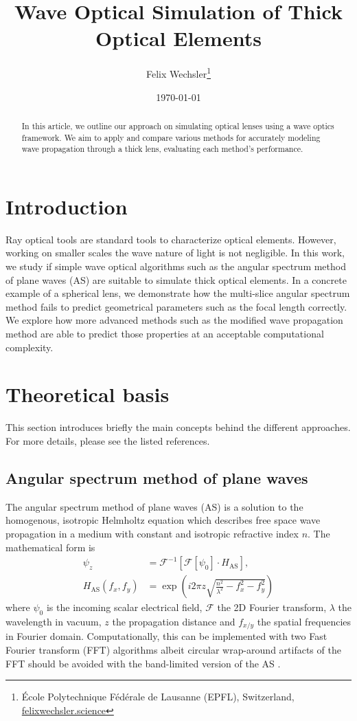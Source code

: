 \documentclass[a4paper,12pt]{article}
\title{Wave Optical Simulation of Thick Optical Elements}
\author{Felix Wechsler\footnote{École Polytechnique Fédérale de Lausanne (EPFL), Switzerland, \url{felixwechsler.science}}}
\date{\today}
\begin{document}
\maketitle
\thispagestyle{empty}

\begin{abstract}
In this article, we outline our approach on simulating optical lenses using a wave optics framework. 
We aim to apply and compare various methods for accurately modeling wave propagation through a thick lens, evaluating each method's performance.
\end{abstract}


\section{Introduction}
Ray optical tools are standard tools to characterize optical elements. However, working on smaller scales the wave nature of light is not negligible.
In this work, we study if simple wave optical algorithms such as the angular spectrum method of plane waves (AS) are suitable to
simulate thick optical elements.
In a concrete example of a spherical lens, we demonstrate how the multi-slice angular spectrum method fails to predict geometrical parameters such as the focal length correctly.
We explore how more advanced methods such as the modified wave propagation method \cite{schmidt2016wave} are able to predict those properties at an 
acceptable computational complexity. 


\section{Theoretical basis}
This section introduces briefly the main concepts behind the different approaches.
For more details, please see the listed references.
\subsection{Angular spectrum method of plane waves}
The angular spectrum method of plane waves (AS) is a solution to the homogenous, isotropic Helmholtz equation which describes free space wave propagation
in a medium with constant and isotropic refractive index $n$.
The mathematical form is
\begin{align}
\psi_{z}&=\mathcal{F}^{-1}\left[\mathcal{F}\left[\psi_{0}\right] \cdot H_{\textrm{AS}}\right],\\
H_{\textrm{AS}}\left(f_{x},f_{y}\right)&=\exp\left(i2\pi z\sqrt{\frac{n^2}{\lambda^{2}}-f_{x}^{2}-f_{y}^{2}}\right)
\end{align}
where $\psi_0$ is the incoming scalar electrical field, $\mathcal{F}$ the 2D Fourier transform, $\lambda$ the wavelength in vacuum, $z$ the propagation distance and $f_{x/y}$ the spatial frequencies in Fourier domain.
Computationally, this can be implemented with two Fast Fourier transform (FFT) algorithms albeit circular wrap-around artifacts of the FFT should be avoided
with the band-limited version of the AS \cite{matsushima2009band}.
\end{document}

